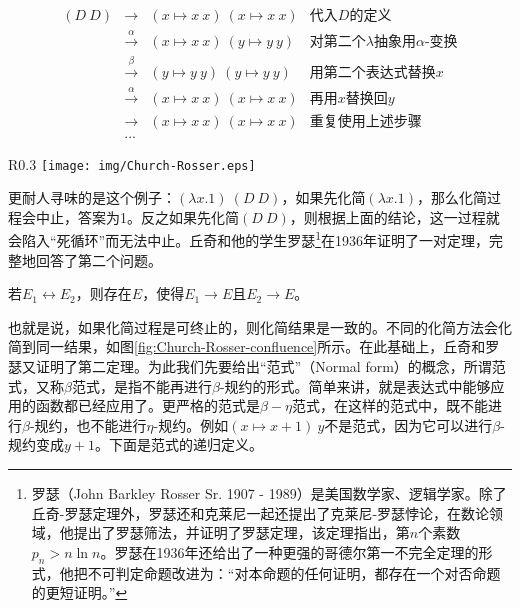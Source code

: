 \documentclass[UTF8]{article}
\begin{document}
\[
\begin{array}{rcll}
(D\ D) & \to & (x \mapsto x\ x)\ (x \mapsto x\ x) & \text{代入$D$的定义} \\
       & \xrightarrow{\alpha} & (x \mapsto x\ x)\ (y \mapsto y\ y) & \text{对第二个$\lambda$抽象用$\alpha$-变换} \\
       & \xrightarrow{\beta} & (y \mapsto y\ y)\ (y \mapsto y\ y) & \text{用第二个表达式替换$x$} \\
       & \xrightarrow{\alpha} & (x \mapsto x\ x)\ (x \mapsto x\ x) & \text{再用$x$替换回$y$} \\
       & \to & (x \mapsto x\ x)\ (x \mapsto x\ x) & \text{重复使用上述步骤} \\
       & ... &
\end{array}
\]

\begin{wrapfigure}{R}{0.3\textwidth}
 \centering
 \texttt{[image: img/Church-Rosser.eps]}
 \caption{丘奇-罗瑟定理的示意}
 \label{fig:Church-Rosser-confluence}
\end{wrapfigure}

更耐人寻味的是这个例子：$(\lambda x . 1)\ (D\ D)$，如果先化简$(\lambda x . 1)$，那么化简过程会中止，答案为1。反之如果先化简$(D\ D)$，则根据上面的结论，这一过程就会陷入“死循环”而无法中止。丘奇和他的学生罗瑟\footnote{罗瑟（John Barkley Rosser Sr. 1907 - 1989）是美国数学家、逻辑学家。除了丘奇-罗瑟定理外，罗瑟还和克莱尼一起还提出了克莱尼-罗瑟悖论，在数论领域，他提出了罗瑟筛法，并证明了罗瑟定理，该定理指出，第$n$个素数$p_n > n \ln n$。罗瑟在1936年还给出了一种更强的哥德尔第一不完全定理的形式，他把不可判定命题改进为：“对本命题的任何证明，都存在一个对否命题的更短证明。”}在1936年证明了一对定理，完整地回答了第二个问题。

\begin{theorem}[丘奇-罗瑟罗瑟定理一]
若$E_1 \leftrightarrow E_2$，则存在$E$，使得$E_1 \to E$且$E_2 \to E$。
\end{theorem}

也就是说，如果化简过程是可终止的，则化简结果是一致的。不同的化简方法会化简到同一结果，如图\ref{fig:Church-Rosser-confluence}所示。在此基础上，丘奇和罗瑟又证明了第二定理。为此我们先要给出“范式”（Normal form）的概念，所谓范式，又称$\beta$范式，是指不能再进行$\beta$-规约的形式。简单来讲，就是表达式中能够应用的函数都已经应用了。更严格的范式是$\beta-\eta$范式，在这样的范式中，既不能进行$\beta$-规约，也不能进行$\eta$-规约。例如$(x \mapsto x + 1)\ y$不是范式，因为它可以进行$\beta$-规约变成$y + 1$。下面是范式的递归定义。
\end{document}
